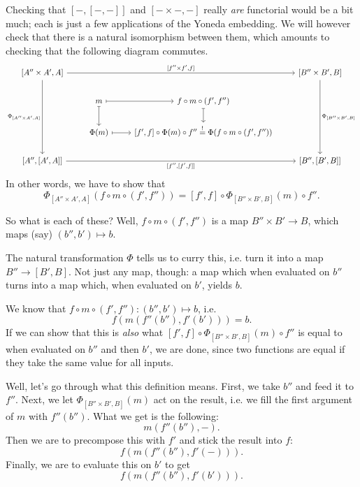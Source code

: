 \documentclass[a4paper]{report}
\theoremstyle{definition}
\theoremstyle{plain}
\theoremstyle{remark}
\begin{document}
Checking that $[-,[-,-]]$ and $[-\times-, -]$ really \emph{are} functorial would be a bit much; each is just a few applications of the Yoneda embedding. We will however check that there is a natural isomorphism between them, which amounts to checking that the following diagram commutes.
\begin{equation*}
  \begin{tikzcd}
    {[A'' \times A', A]}
    \arrow[rrr, "{[f'' \times f', f]}"]
    \arrow[ddd, swap, "{\Phi_{[A'' \times A', A]}}"]
    & & & {[B'' \times B', B]}
    \arrow[ddd, "{\Phi_{[B'' \times B', B]}}"]
    \\
    & m
    \arrow[d, mapsto]
    \arrow[r, mapsto]
    & f \circ m \circ (f', f'')
    \arrow[d, mapsto]
    \\
    & \Phi(m)
    \arrow[r, mapsto]
    & {[f', f] \circ \Phi(m) \circ f'' \stackrel{!}{=} \Phi(f \circ m \circ (f', f''))} 
    \\
    {[A'', [A', A]]}
    \arrow[rrr, swap, "{[f'', [f', f]]}"]
    & & & {[B'', [B', B]]}
  \end{tikzcd}
\end{equation*}
In other words, we have to show that 
\begin{equation*}
  \Phi_{[A'' \times A', A]}(f \circ m \circ (f', f'')) = [f', f] \circ \Phi_{[B'' \times B', B]}(m) \circ f''.
\end{equation*}

So what is each of these? Well, $f \circ m \circ (f', f'')$ is a map $B'' \times B' \to B$, which maps (say) $(b'', b') \mapsto b$. 

The natural transformation $\Phi$ tells us to curry this, i.e. turn it into a map $B'' \to [B', B]$. Not just any map, though: a map which when evaluated on $b''$ turns into a map which, when evaluated on $b'$, yields $b$.

We know that $f \circ m \circ (f', f'')\colon (b'', b') \mapsto b$, i.e.
\begin{equation*}
  f(m(f''(b''), f'(b'))) = b.
\end{equation*}
If we can show that this is \emph{also} what $[f', f] \circ \Phi_{[B'' \times B', B]}(m) \circ f''$ is equal to when evaluated on $b''$ and then $b'$, we are done, since two functions are equal if they take the same value for all inputs.

Well, let's go through what this definition means. First, we take $b''$ and feed it to $f''$. Next, we let $\Phi_{[B'' \times B', B]}(m)$ act on the result, i.e. we fill the first argument of $m$ with $f''(b'')$. What we get is the following:
\begin{equation*}
  m(f''(b''), -).
\end{equation*}
Then we are to precompose this with $f'$ and stick the result into $f$:
\begin{equation*}
  f(m(f''(b''), f'(-))).
\end{equation*}
Finally, we are to evaluate this on $b'$ to get
\begin{equation*}
  f(m(f''(b''), f'(b'))).
\end{equation*}
\end{document}
